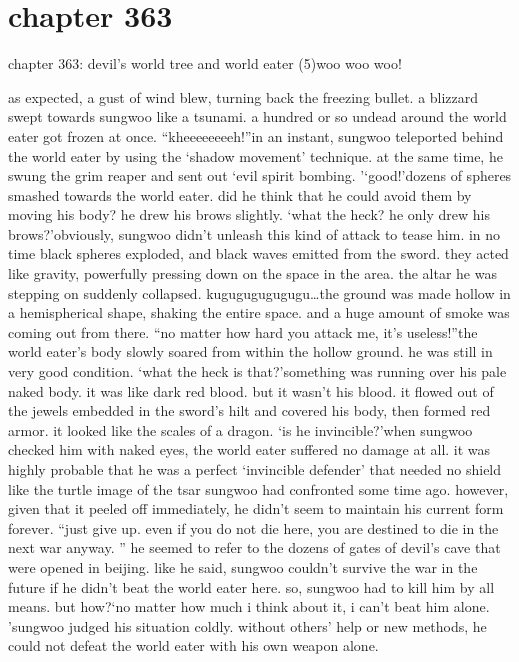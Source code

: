 \section{chapter 363}

chapter 363: devil’s world tree and world eater (5)woo woo woo!




as expected, a gust of wind blew, turning back the freezing bullet.
 a blizzard swept towards sungwoo like a tsunami.
 a hundred or so undead around the world eater got frozen at once.
“kheeeeeeeeh!”in an instant, sungwoo teleported behind the world eater by using the ‘shadow movement’ technique.
 at the same time, he swung the grim reaper and sent out ‘evil spirit bombing.
’‘good!’dozens of spheres smashed towards the world eater.
 did he think that he could avoid them by moving his body? he drew his brows slightly.
‘what the heck? he only drew his brows?’obviously, sungwoo didn’t unleash this kind of attack to tease him.
in no time black spheres exploded, and black waves emitted from the sword.
 they acted like gravity, powerfully pressing down on the space in the area.
 the altar he was stepping on suddenly collapsed.
kugugugugugugu…the ground was made hollow in a hemispherical shape, shaking the entire space.
 and a huge amount of smoke was coming out from there.
“no matter how hard you attack me, it’s useless!”the world eater’s body slowly soared from within the hollow ground.
 he was still in very good condition.
‘what the heck is that?’something was running over his pale naked body.
 it was like dark red blood.
 but it wasn’t his blood.
 it flowed out of the jewels embedded in the sword’s hilt and covered his body, then formed red armor.
 it looked like the scales of a dragon.
‘is he invincible?’when sungwoo checked him with naked eyes, the world eater suffered no damage at all.
 it was highly probable that he was a perfect ‘invincible defender’ that needed no shield like the turtle image of the tsar sungwoo had confronted some time ago.
however, given that it peeled off immediately, he didn’t seem to maintain his current form forever.
“just give up.
 even if you do not die here, you are destined to die in the next war anyway.
”
he seemed to refer to the dozens of gates of devil’s cave that were opened in beijing.
like he said, sungwoo couldn’t survive the war in the future if he didn’t beat the world eater here.
 so, sungwoo had to kill him by all means.
but how?‘no matter how much i think about it, i can’t beat him alone.
’sungwoo judged his situation coldly.
 without others’ help or new methods, he could not defeat the world eater with his own weapon alone.
